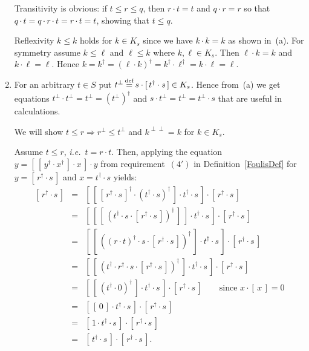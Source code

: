 \documentclass{article}
\newenvironment{proof}[1][Proof]{ \begin{trivlist}\item[\hskip \labelsep {\bfseries #1}]}{ \end{trivlist}}
\newcommand{\sai}[1]{[\,#1\,]}
\begin{document}
\begin{proof}
\begin{enumerate}
Transitivity is obvious: if $t\leq r \leq q$, then $r\cdot t = t$ and
$q\cdot r = r$ so that $q\cdot t = q\cdot r\cdot t = r\cdot t = t$,
showing that $t\leq q$.

Reflexivity $k\leq k$ holds for $k\in K_s$ since we have $k\cdot k =
k$ as shown in~(a). For symmetry assume $k\leq \ell$ and $\ell\leq k$
where $k,\ell\in K_{s}$. Then $\ell\cdot k = k$ and $k\cdot \ell =
\ell$. Hence $k = k^{\dag} = (\ell\cdot k)^{\dag} = k^{\dag} \cdot \ell^{\dag}
= k\cdot \ell = \ell$.

\item For an arbitrary $t\in S$ put $t^{\perp}
  \,\smash{\stackrel{\textrm{def}}{=}}\, s\cdot \sai{t^{\dag}\cdot s} \in
  K_{s}$. Hence from~(a) we get equations $t^{\perp} \cdot t^{\perp} =
  t^{\perp} = (t^{\perp})^{\dag}$ and $s\cdot t^{\perp} = t^{\perp} =
  t^{\perp}\cdot s$ that are useful in calculations.

We will show $t\leq r \Rightarrow r^{\perp} \leq t^{\perp}$
and $k^{\perp\perp} = k$ for $k\in K_{s}$.

Assume $t\leq r$, \textit{i.e.}~$t = r\cdot t$. Then, applying the
equation $y = \sai{\sai{y^{\dag}\cdot x^{\dag}}\cdot x} \cdot y$ from
requirement~$(4')$ in Definition~\ref{FoulisDef} for $y =
\sai{r^{\dag}\cdot s}$ and $x= t^{\dag}\cdot s$ yields:
$$\begin{array}{rcl}
\sai{r^{\dag}\cdot s}
& = &
\sai{\sai{\sai{r^{\dag}\cdot s}^{\dag}\cdot (t^{\dag}\cdot s)^{\dag}}
   \cdot t^{\dag}\cdot s}\cdot \sai{r^{\dag}\cdot s} \\
& = &
\sai{\sai{\sai{(t^{\dag}\cdot s\cdot \sai{r^{\dag}\cdot s})^{\dag}}}
   \cdot t^{\dag}\cdot s}\cdot \sai{r^{\dag}\cdot s} \\
& = &
\sai{\sai{((r\cdot t)^{\dag}\cdot s\cdot \sai{r^{\dag}\cdot s})^{\dag}}
   \cdot t^{\dag}\cdot s}\cdot \sai{r^{\dag}\cdot s} \\
& = &
\sai{\sai{(t^{\dag}\cdot r^{\dag}\cdot s\cdot \sai{r^{\dag}\cdot s})^{\dag}}
   \cdot t^{\dag}\cdot s}\cdot \sai{r^{\dag}\cdot s} \\
& = &
\sai{\sai{(t^{\dag} \cdot 0)^{\dag}} 
   \cdot t^{\dag}\cdot s}\cdot \sai{r^{\dag}\cdot s}
   \qquad\mbox{since $x\cdot \sai{x}=0$} \\
& = &
\sai{\sai{0} \cdot t^{\dag}\cdot s}\cdot \sai{r^{\dag}\cdot s} \\
& = &
\sai{1 \cdot t^{\dag}\cdot s}\cdot \sai{r^{\dag}\cdot s} \\
& = &
\sai{t^{\dag}\cdot s}\cdot \sai{r^{\dag}\cdot s}.
\end{array}$$


\end{enumerate}
\end{proof}
\end{document}

